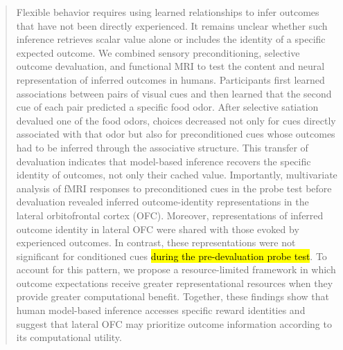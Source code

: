 \documentclass[9pt,twocolumn,twoside]{pnas-new}
\begin{document}
\begin{abstract}
Flexible behavior requires using learned relationships to infer outcomes that have not been directly experienced. It remains unclear whether such inference retrieves scalar value alone or includes the identity of a specific expected outcome. We combined sensory preconditioning, selective outcome devaluation, and functional MRI to test the content and neural representation of inferred outcomes in humans. Participants first learned associations between pairs of visual cues and then learned that the second cue of each pair predicted a specific food odor. After selective satiation devalued one of the food odors, choices decreased not only for cues directly associated with that odor but also for preconditioned cues whose outcomes had to be inferred through the associative structure. This transfer of devaluation indicates that model-based inference recovers the specific identity of outcomes, not only their cached value. Importantly, multivariate analysis of fMRI responses to preconditioned cues in the probe test before devaluation revealed inferred outcome-identity representations in the lateral orbitofrontal cortex (OFC). Moreover, representations of inferred outcome identity in lateral OFC were shared with those evoked by experienced outcomes. In contrast, these representations were not significant for conditioned cues \hl{during the pre-devaluation probe test}. To account for this pattern, we propose a resource-limited framework in which outcome expectations receive greater representational resources when they provide greater computational benefit. Together, these findings show that human model-based inference accesses specific reward identities and suggest that lateral OFC may prioritize outcome information according to its computational utility.
\end{abstract}



\maketitle
\thispagestyle{firststyle}

\Firstpage

\end{document}
